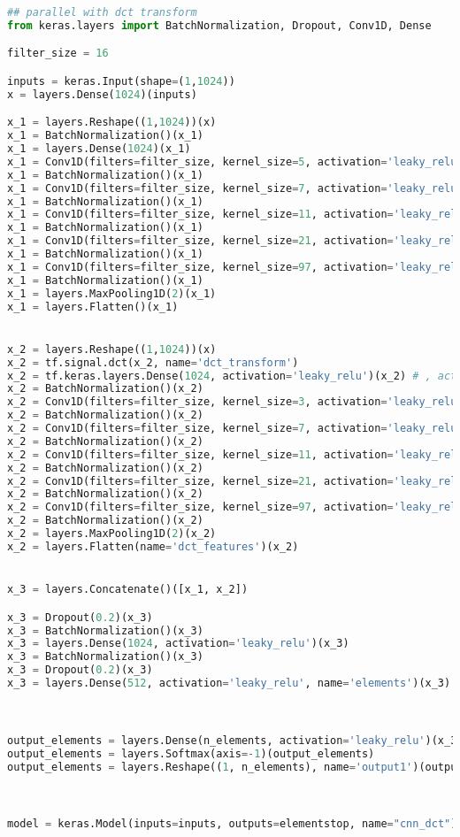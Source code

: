 \begin{lstlisting}[language=Python]
## parallel with dct transform
from keras.layers import BatchNormalization, Dropout, Conv1D, Dense

filter_size = 16

inputs = keras.Input(shape=(1,1024))
x = layers.Dense(1024)(inputs)

x_1 = layers.Reshape((1,1024))(x)
x_1 = BatchNormalization()(x_1)
x_1 = layers.Dense(1024)(x_1)
x_1 = Conv1D(filters=filter_size, kernel_size=5, activation='leaky_relu',data_format='channels_first')(x_1)
x_1 = BatchNormalization()(x_1)
x_1 = Conv1D(filters=filter_size, kernel_size=7, activation='leaky_relu',data_format='channels_first')(x_1)
x_1 = BatchNormalization()(x_1)
x_1 = Conv1D(filters=filter_size, kernel_size=11, activation='leaky_relu',data_format='channels_first')(x_1)
x_1 = BatchNormalization()(x_1)
x_1 = Conv1D(filters=filter_size, kernel_size=21, activation='leaky_relu',data_format='channels_first')(x_1)
x_1 = BatchNormalization()(x_1)
x_1 = Conv1D(filters=filter_size, kernel_size=97, activation='leaky_relu',data_format='channels_first')(x_1)
x_1 = BatchNormalization()(x_1)
x_1 = layers.MaxPooling1D(2)(x_1)
x_1 = layers.Flatten()(x_1)


x_2 = layers.Reshape((1,1024))(x)
x_2 = tf.signal.dct(x_2, name='dct_transform')
x_2 = tf.keras.layers.Dense(1024, activation='leaky_relu')(x_2) # , activity_regularizer='l1'
x_2 = BatchNormalization()(x_2)
x_2 = Conv1D(filters=filter_size, kernel_size=3, activation='leaky_relu',data_format='channels_first')(x_2)
x_2 = BatchNormalization()(x_2)
x_2 = Conv1D(filters=filter_size, kernel_size=7, activation='leaky_relu',data_format='channels_first')(x_2)
x_2 = BatchNormalization()(x_2)
x_2 = Conv1D(filters=filter_size, kernel_size=11, activation='leaky_relu',data_format='channels_first')(x_2)
x_2 = BatchNormalization()(x_2)
x_2 = Conv1D(filters=filter_size, kernel_size=21, activation='leaky_relu',data_format='channels_first')(x_2)
x_2 = BatchNormalization()(x_2)
x_2 = Conv1D(filters=filter_size, kernel_size=97, activation='leaky_relu',data_format='channels_first')(x_2)
x_2 = BatchNormalization()(x_2)
x_2 = layers.MaxPooling1D(2)(x_2)
x_2 = layers.Flatten(name='dct_features')(x_2)


x_3 = layers.Concatenate()([x_1, x_2])

x_3 = Dropout(0.2)(x_3)
x_3 = BatchNormalization()(x_3)
x_3 = layers.Dense(1024, activation='leaky_relu')(x_3)
x_3 = BatchNormalization()(x_3)
x_3 = Dropout(0.2)(x_3)
x_3 = layers.Dense(512, activation='leaky_relu', name='elements')(x_3)



output_elements = layers.Dense(n_elements, activation='leaky_relu')(x_3)
output_elements = layers.Softmax(axis=-1)(output_elements)
output_elements = layers.Reshape((1, n_elements), name='output1')(output_elements)



model = keras.Model(inputs=inputs, outputs=elementstop, name="cnn_dct")
\end{lstlisting}

